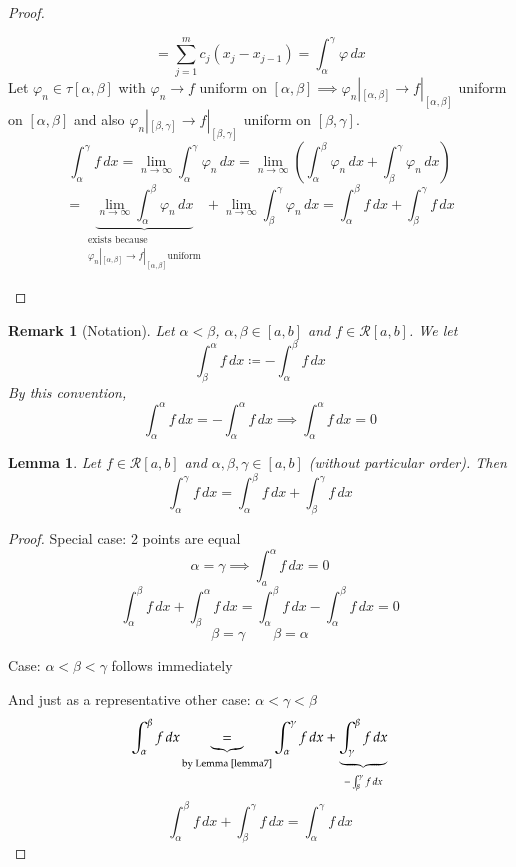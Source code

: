 \documentclass{article}
\newtheorem{lemma}{Lemma}  \numberwithin{lemma}{section}
\newtheorem{remark}{Remark}  \numberwithin{remark}{section}
\begin{document}
\begin{proof}
\begin{description}
\[      \]
      \[ = \sum_{j=1}^m c_j(x_j - x_{j-1}) = \int_{\alpha}^\gamma \varphi \, dx \]
      Let $\varphi_n \in \tau[\alpha,\beta]$ with $\varphi_n \to f$ uniform on $[\alpha, \beta] \implies \varphi_n|_{[\alpha,\beta]} \to f|_{[\alpha,\beta]}$ uniform on $[\alpha,\beta]$ and also $\varphi_n|_{[\beta,\gamma]} \to f|_{[\beta,\gamma]}$ uniform on $[\beta,\gamma]$.
      \[ \int_{\alpha}^\gamma f \, dx = \lim_{n\to\infty} \int_{\alpha}^\gamma \varphi_n \, dx = \lim_{n\to\infty} \left(\int_{\alpha}^\beta \varphi_n \, dx + \int_{\beta}^\gamma \varphi_n \, dx\right) \]
      \[
        = \underbrace{\lim_{n\to\infty} \int_{\alpha}^\beta \varphi_n \, dx}_{\substack{\text{exists because } \\ \varphi_n|_{[\alpha,\beta]} \to f|_{[\alpha,\beta]} \text{uniform}}} + \lim_{n\to\infty} \int_{\beta}^\gamma \varphi_n \, dx
        = \int_{\alpha}^\beta f \, dx + \int_{\beta}^\gamma f \, dx
      \]
  \end{description}
\end{proof}

\begin{remark}[Notation]
  Let $\alpha < \beta$, $\alpha, \beta \in [a,b]$ and $f \in \mathcal R[a,b]$. We let
  \[ \int_{\beta}^\alpha f \, dx \coloneqq -\int_{\alpha}^\beta f \, dx \]
  By this convention,
  \[ \int_{\alpha}^\alpha f \, dx = -\int_{\alpha}^\alpha f \, dx \implies \int_{\alpha}^\alpha f \, dx = 0 \]
\end{remark}

\begin{lemma} %
  \label{lemma8}
  Let $f \in \mathcal R[a,b]$ and $\alpha,\beta,\gamma \in [a,b]$ (without particular order).
  Then
  \[ \int_{\alpha}^\gamma f \, dx = \int_{\alpha}^\beta f \, dx + \int_{\beta}^\gamma f \, dx \]
\end{lemma}

\begin{proof}
  Special case: 2 points are equal
  \[ \alpha = \gamma \implies \int_a^\alpha f \, dx = 0 \]
  \[ \int_\alpha^\beta f \, dx + \int_\beta^\alpha f \, dx = \int_{\alpha}^\beta f \, dx - \int_\alpha^\beta f \, dx = 0 \]
  \[ \beta = \gamma \qquad \beta = \alpha \]

  Case: $\alpha < \beta < \gamma$ follows immediately

  And just as a representative other case: $\alpha < \gamma < \beta$
  \[ \int_{\alpha}^\beta f \, dx \underbrace{=}_{\text{by Lemma~\ref{lemma7}}} \int_{\alpha}^\gamma f \, dx + \underbrace{\int_{\gamma}^\beta f \, dx}_{- \int_{\beta}^\gamma f \, dx} \]
  \[ \int_\alpha^\beta f \, dx + \int_\beta^\gamma f \, dx = \int_\alpha^\gamma f \, dx \]
\end{proof}
\end{document}
